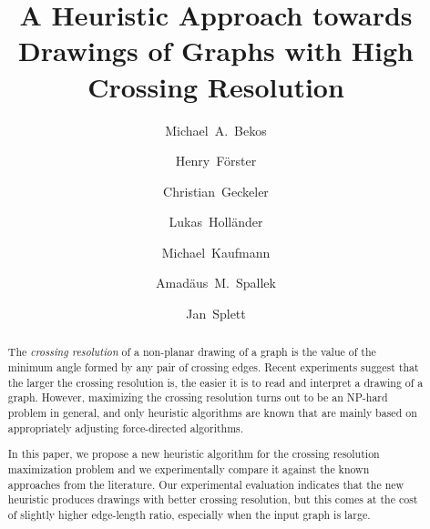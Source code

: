 \documentclass{comjnl}
\begin{document}
\author{Michael~A.~Bekos} 
\author{Henry~F\"orster}
\author{Christian~Geckeler} 
\author{Lukas~Holl\"ander} 
\author{Michael~Kaufmann}
\author{Amad\"aus~M.~Spallek} 
\author{Jan~Splett}

\title[Drawings of Graphs with High Crossing Resolution]{A Heuristic Approach towards Drawings of Graphs with High Crossing Resolution}






\volumenumber{--} 
\issuenumber{--} 

\begin{abstract}
The \emph{crossing resolution} of a non-planar drawing of a graph is the value of the minimum angle formed by any pair of crossing edges. Recent experiments suggest that the larger the crossing resolution is, the easier it is to read and interpret a drawing of a graph. However, maximizing the crossing resolution turns out to be an NP-hard problem in general, and only heuristic algorithms are known that are mainly based on appropriately adjusting force-directed algorithms.

In this paper, we propose a new heuristic algorithm for the crossing resolution maximization problem and we experimentally compare it against the known approaches from the literature. Our experimental evaluation indicates that the new heuristic produces drawings with better crossing resolution, but this comes at the cost of slightly higher edge-length ratio, especially when the input graph is large. 
\end{abstract}

\maketitle
\end{document}
